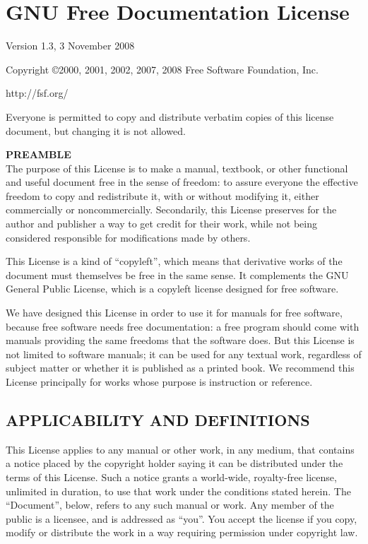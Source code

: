 \chapter{GNU Free Documentation License}
\label{app:gnufreedocumentationlicense}
\begin{centering}
Version 1.3, 3 November 2008

Copyright \copyright 2000, 2001, 2002, 2007, 2008 Free Software Foundation, Inc.

http://fsf.org/

\end{centering}
\vspace{0.1in}
Everyone is permitted to copy and distribute verbatim copies of this
license document, but changing it is not allowed.
\vspace{0.1in}

\textbf{\Large{PREAMBLE}} \\
The purpose of this License is to make a manual, textbook,
or other functional and useful document free in the sense of
freedom: to assure everyone the effective freedom to copy
and redistribute it, with or without modifying it, either
commercially or noncommercially. Secondarily, this License
preserves for the author and publisher a way to get credit
for their work, while not being considered responsible for
modifications made by others.

This License is a kind of “copyleft”, which means that
derivative works of the document must themselves be free in
the same sense. It complements the GNU General Public License,
which is a copyleft license designed for free software.

We have designed this License in order to use it for
manuals for free software, because free software needs free
documentation: a free program should come with manuals
providing the same freedoms that the software does. But
this License is not limited to software manuals; it can be
used for any textual work, regardless of subject matter or
whether it is published as a printed book. We recommend this
License principally for works whose purpose is instruction
or reference.  

\section{APPLICABILITY AND DEFINITIONS}
This License applies to any manual or other work, in any
medium, that contains a notice placed by the copyright
holder saying it can be distributed under the terms of this
License. Such a notice grants a world-wide, royalty-free
license, unlimited in duration, to use that work under
the conditions stated herein. The “Document”, below,
refers to any such manual or work. Any member of the public
is a licensee, and is addressed as “you”. You accept the
license if you copy, modify or distribute the work in a way
requiring permission under copyright law.

